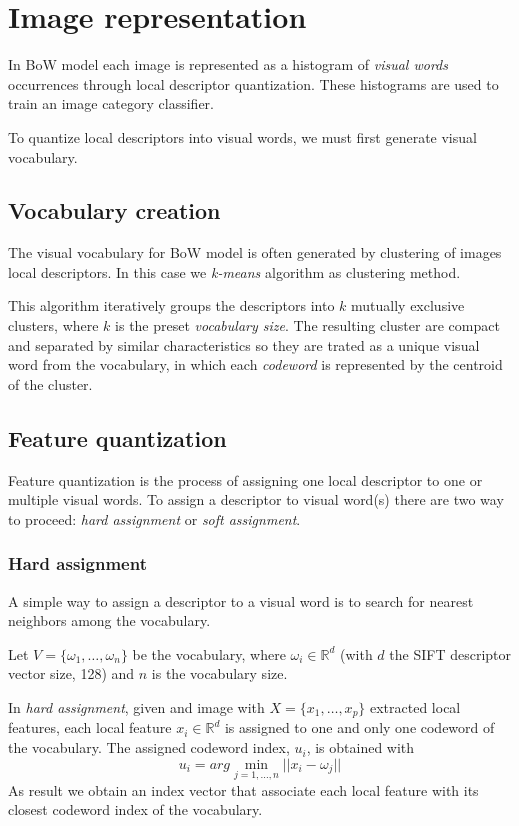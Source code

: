 \section{Image representation}

In BoW model each image is represented as a histogram of \emph{visual words} occurrences through local descriptor quantization\cite{DBLP:journals/corr/abs-1304-5168}. These histograms are used to train an image category classifier.

To quantize local descriptors into visual words, we must first generate visual vocabulary. 

\subsection{Vocabulary creation}

The visual vocabulary for BoW model is often generated by clustering of images local descriptors. In this case we \emph{k-means} algorithm as clustering method.

This algorithm iteratively groups the descriptors into $k$ mutually exclusive clusters, where $k$ is the preset \emph{vocabulary size}. The resulting cluster are compact and separated by similar characteristics so they are trated as a unique visual word from the vocabulary, in which each \emph{codeword} is represented by the centroid of the cluster.

\subsection{Feature quantization}

Feature quantization is the process of assigning one local descriptor to one or multiple
visual words. To assign a descriptor to visual word(s) there are two way to proceed: \emph{hard assignment} or \emph{soft assignment}.

\subsubsection{Hard assignment}

A simple way to assign a descriptor to a visual word is to search for nearest neighbors among the vocabulary.

Let $V = \{\omega_1, \ldots, \omega_n \}$ be the vocabulary, where $\omega_i \in \mathbb{R}^{d}$ (with $d$ the SIFT descriptor vector size, 128) and $n$ is the vocabulary size.

In \emph{hard assignment}, given and image with $X = \{x_1, \ldots, x_p\}$ extracted local features, each local feature $x_i \in \mathbb{R}^{d}$ is assigned to one and only one codeword of the vocabulary. The assigned codeword index, $u_i$, is obtained with
\begin{equation}
u_i = arg \min_{j = 1, \ldots, n} ||x_i - \omega_j||
\end{equation}
As result we obtain an index vector that associate each local feature with its closest codeword index of the vocabulary.

